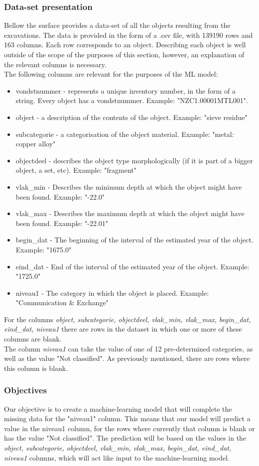 \subsubsection{Data-set presentation}
Bellow the surface provides a data-set\cite{BelowAmsterdam} of all the objects resulting from the excavations. The data is provided in the form of a .csv file, with 139190 rows and 163 columns. Each row corresponds to an object. Describing each object is well outside of the scope of the purposes of this section, however, an explanation of the relevant columns is necessary. \\
The following columns are relevant for the purposes of the ML model: 
\begin{itemize}
    \item vondstnummer - represents a unique inventory number, in the form of a string. Every object has a vondstnummer. Example: "NZC1.00001MTL001".
    \item  object -  a description of the contents of the object. Example: "sieve residue"
    \item  subcategorie - a categorisation of the object material. Example: "metal: copper alloy"
    \item objectdeel - describes the object type morphologically (if it is part of a bigger object, a set, etc). Example: "fragment"
    \item vlak\_min - Describes the minimum depth at which the object might have been found. Example: "-22.0"
    \item vlak\_max - Describes the maximum depth at which the object might have been found. Example: "-22.01"
    \item begin\_dat - The beginning of the interval of the estimated year of the object. Example: "1675.0"
    \item eind\_dat - End of the interval of the estimated year of the object. Example: "1725.0"
    \item niveau1 - The category in which the object is placed. Example:  "Communication \& Exchange"
\end{itemize}
For the columns \textit{object, subcategorie, objectdeel, vlak\_min, vlak\_max, begin\_dat, eind\_dat,  niveau1} there are rows in the dataset in which one or more of these columns are blank.  \\
The column \textit{niveau1} can take the value of one of 12 pre-determined categories, as well as the value "Not classified". As previously mentioned, there are rows where this column is blank. 
\subsubsection{Objectives}
Our objective is to create a machine-learning model that will complete the missing data for the "niveau1" column. This means that our model will predict a value in the niveau1 column, for the rows where currently that column is blank or has the value "Not classified". The prediction will be based on the values in the \textit{object, subcategorie, objectdeel, vlak\_min, vlak\_max, begin\_dat, eind\_dat,  niveau1} columns, which will act like input to the machine-learning model. 

